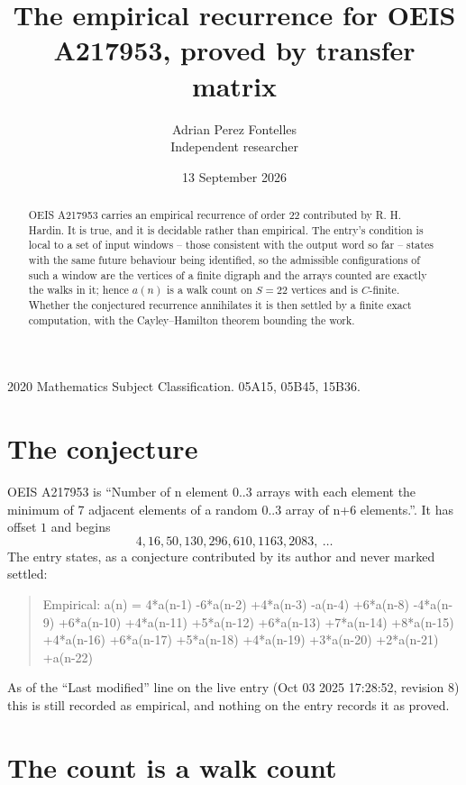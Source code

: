 \documentclass[11pt,a4paper]{article}
\title{The empirical recurrence for OEIS A217953, proved by transfer matrix}
\author{Adrian Perez Fontelles\\ \small Independent researcher}
\date{13 September 2026}
\theoremstyle{plain}
\theoremstyle{definition}
\begin{document}
\maketitle

\begin{abstract}
OEIS A217953 carries an empirical recurrence of order $22$ contributed by R. H. Hardin. It is
true, and it is decidable rather than empirical. The entry's condition is local to a set of input windows -- those consistent with the output word so far -- states with the same future behaviour being identified, so
the admissible configurations of such a window are the vertices of a finite digraph and the
arrays counted are exactly the walks in it; hence $a(n)$ is a walk count on $S=22$ vertices
and is $C$-finite. Whether the conjectured recurrence annihilates it is then settled by a
finite exact computation, with the Cayley--Hamilton theorem bounding the work.
\end{abstract}

\noindent\small 2020 Mathematics Subject Classification. 05A15, 05B45, 15B36.\normalsize

\section{The conjecture}

OEIS A217953 is ``Number of n element 0..3 arrays with each element the minimum of 7 adjacent elements of a random 0..3 array of n+6 elements.''. It has offset $1$ and begins
\[
4, 16, 50, 130, 296, 610, 1163, 2083,\ \dots
\]
The entry states, as a conjecture contributed by its author and never marked settled:
\begin{quote}
Empirical: a(n) = 4*a(n-1) -6*a(n-2) +4*a(n-3) -a(n-4) +6*a(n-8) -4*a(n-9) +6*a(n-10) +4*a(n-11) +5*a(n-12) +6*a(n-13) +7*a(n-14) +8*a(n-15) +4*a(n-16) +6*a(n-17) +5*a(n-18) +4*a(n-19) +3*a(n-20) +2*a(n-21) +a(n-22)
\end{quote}
As of the ``Last modified'' line on the live entry (Oct 03 2025 17:28:52, revision 8) this is still
recorded as empirical, and nothing on the entry records it as proved.

\section{The count is a walk count}
\end{document}
